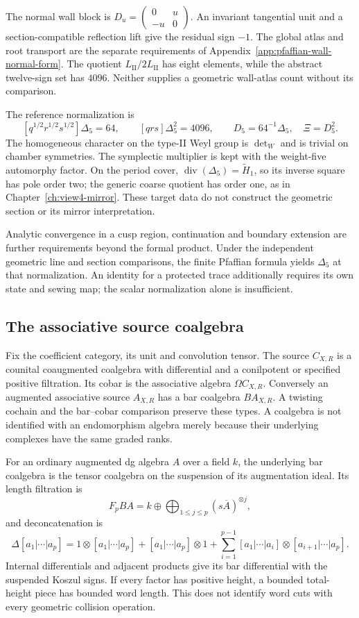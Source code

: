 The normal wall block is \(D_u=\left(\begin{smallmatrix}0&u\\-u&0\end{smallmatrix}\right)\).
An invariant tangential unit and a section-compatible reflection
lift give the residual sign \(-1\). The global atlas and root
transport are the separate requirements of
Appendix~\ref{app:pfaffian-wall-normal-form}.
The quotient \(L_{\mathrm{II}}/2L_{\mathrm{II}}\) has eight
elements, while the abstract twelve-sign set has \(4096\).
Neither supplies a geometric wall-atlas count without its comparison.

The reference normalization is
\[
 [q^{1/2}r^{1/2}s^{1/2}]\Delta_5=64,\qquad
 [qrs]\Delta_5^2=4096,\qquad
 D_5=64^{-1}\Delta_5,\quad\Xi=D_5^2.
\]
The homogeneous character on the type-II Weyl group is \(\det_W\)
and is trivial on chamber symmetries. The symplectic multiplier is
kept with the weight-five automorphy factor. On the period cover,
\(\operatorname{div}(\Delta_5)=\widetilde H_1\), so its inverse
square has pole order two; the generic coarse quotient has order
one, as in Chapter~\ref{ch:view4-mirror}. These target data do not
construct the geometric section or its mirror interpretation.

Analytic convergence in a cusp region, continuation and boundary
extension are further requirements beyond the formal product.
Under the independent geometric line and section comparisons, the
finite Pfaffian formula yields \(\Delta_5\) at that normalization.
An identity for a protected trace additionally requires its own
state and sewing map; the scalar normalization alone is insufficient.

\subsection{The associative source coalgebra}
\label{app:build-koszul}

Fix the coefficient category, its unit and convolution tensor.
The source \(C_{X,R}\) is a counital coaugmented coalgebra with
differential and a conilpotent or specified positive filtration.
Its cobar is the associative algebra \(\Omega C_{X,R}\).
Conversely an augmented associative source \(A_{X,R}\) has a bar
coalgebra \(BA_{X,R}\). A twisting cochain and the bar--cobar
comparison preserve these types. A coalgebra is not identified
with an endomorphism algebra merely because their underlying
complexes have the same graded ranks.

For an ordinary augmented dg algebra \(A\) over a field \(k\), the underlying bar
coalgebra is the tensor coalgebra on the suspension of its
augmentation ideal. Its length filtration is
\[
 F_p BA=k\oplus\bigoplus_{1\le j\le p}
                (s\overline A)^{\otimes j},
\]
and deconcatenation is
\[
 \Delta[a_1|\cdots|a_p]
 =1\otimes[a_1|\cdots|a_p]+[a_1|\cdots|a_p]\otimes1
  +\sum_{i=1}^{p-1}[a_1|\cdots|a_i]\otimes[a_{i+1}|\cdots|a_p].
\]
Internal differentials and adjacent products give its bar
differential with the suspended Koszul signs. If every factor
has positive height, a bounded total-height piece has bounded
word length. This does not identify word cuts with every
geometric collision operation.

